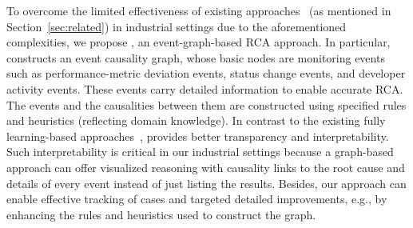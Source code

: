 To overcome the limited effectiveness of existing approaches~\cite{sole2017survey,nguyen2013fchain,chen2014causeinfer,ma2020diagnosing,schoenfisch2018root,brandon2020graph,yoon2016dbsherlock,jeyakumar2019explainit,jayathilaka2017performance,zhao2020automatically,marvasti2013anomaly,weng2018root,qiu2020causality,meng2020localizing, kim2013root} (as mentioned in Section~\ref{sec:related}) in industrial settings due to the aforementioned complexities, we propose \system, an event-graph-based RCA approach. %
In particular, \system constructs an event causality graph, whose basic nodes are monitoring events such as performance-metric deviation events, status change events, and developer activity events. These events carry detailed information to enable accurate RCA. The events and the causalities between them are constructed using specified rules and heuristics (reflecting domain knowledge). In contrast to the existing fully learning-based approaches~\cite{gan2019seer, ma2020diagnosing, zhao2020automatically}, \system provides better transparency and interpretability. Such interpretability is critical in our industrial settings because a graph-based approach can offer visualized reasoning with causality links to the root cause and details of every event instead of just listing the results. Besides, our approach can enable effective tracking of cases and targeted detailed improvements, e.g., by enhancing the rules and heuristics used to construct the graph. 


